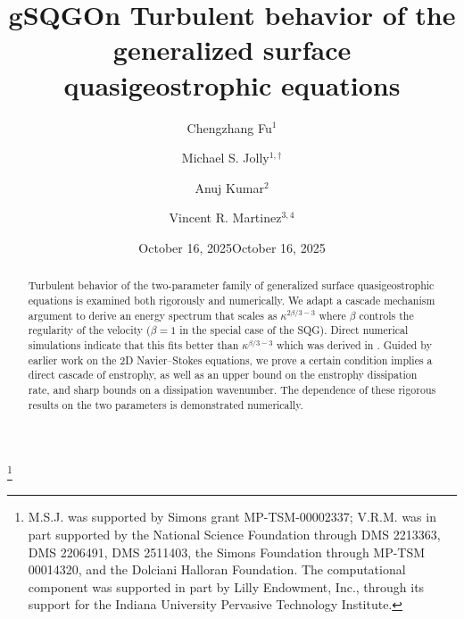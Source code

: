 \documentclass[twoside, reqno]{amsart}
\numberwithin{lemma}{section}
\numberwithin{theorem}{section}
\numberwithin{proposition}{section}
\numberwithin{equation}{section} %
\newcommand{\ka}{\kappa}
\begin{document}
\title{gSQG}
\date{October 16, 2025}
\title[gSQG turbulence]
{On Turbulent behavior of the generalized surface quasigeostrophic equations}
\author{Chengzhang Fu$^{1}$}
\author{Michael S. Jolly$^{1,\dagger}$}
\address{$^1$ Department of Mathematics, Indiana University, Bloomington, IN}
\author{Anuj Kumar$^{2}$}
\address{$^{2}$ New Delhi, India}
\author{Vincent R. Martinez$^{3,4}$}
\address{$^{3}$ Department of Mathematics and Statistics,
CUNY Hunter College, New York City, USA}
\address{$^{4}$ Department of Mathematics,
CUNY Graduate Center, New York City, USA}




\thanks{M.S.J. was supported by Simons grant MP-TSM-00002337; V.R.M. was in part supported by the National Science Foundation through DMS 2213363, DMS 2206491, DMS 2511403, the Simons Foundation through MP-TSM 00014320, and the Dolciani Halloran Foundation. The computational component was supported in part by Lilly Endowment, Inc., through its support for the Indiana University Pervasive Technology Institute.}

\date{October 16, 2025}


\begin{abstract}
Turbulent behavior of the two-parameter family of generalized surface quasigeostrophic equations is examined both rigorously and numerically.  We adapt a cascade mechanism argument to derive an energy spectrum that scales as $\ka^{2\beta/3-3}$ where $\beta$ controls the regularity of the velocity ($\beta=1$ in the special case of the SQG). Direct numerical simulations indicate that this fits better than $\ka^{\beta/3-3}$ which {was} derived in \cite{Pierrehumbert1994}. Guided by earlier work on the 2D Navier--Stokes equations, we prove a certain condition implies  a direct cascade of enstrophy, as well as an upper bound on the enstrophy dissipation rate, and sharp bounds on a dissipation wavenumber. The dependence of these rigorous results on the two parameters is demonstrated numerically.
\end{abstract}
\maketitle
\end{document}

